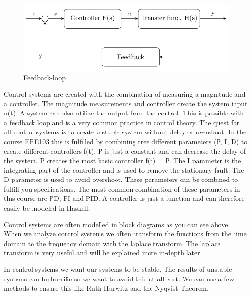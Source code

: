 \begin{figure}[H]
    \centering
    \includegraphics[]{Images/feedback1.PNG}
    \caption{Feedback-loop}
    \label{fig:feed}
\end{figure}


Control systems are created with the combination of measuring a magnitude and a controller. The magnitude measurements and controller create the system input u(t). A system can also utilize the output from the control. This is possible with a feedback loop and is a very common practice in control theory. The quest for all control systems is to create a stable system without delay or overshoot.  In the course ERE103 this is fulfilled by combining tree different parameters (P, I, D) to create different controllers f(t).  P is just a constant and can decrease the delay of the system. P creates the most basic controller f(t) = P. The I parameter is the integrating part of the controller and is used to remove the stationary fault. The D parameter is used to avoid overshoot. These parameters can be combined to fulfill you specifications.  The most common combination of these parameters in this course are PD, PI and PID. A controller is just a function and can therefore easily be modeled in Haskell.



Control systems are often modelled in block diagrams as you can see above. When we analyze control systems we often transform the functions from the time domain to the frequency domain with the laplace transform. The laplace transform is very useful and will be explained more in-depth later.



In control systems we want our systems to be stable. The results of unstable systems can be horrific so we want to avoid this at all cost. We can use a few methods to ensure this like Ruth-Hurwitz and the Nyqvist Theorem.



